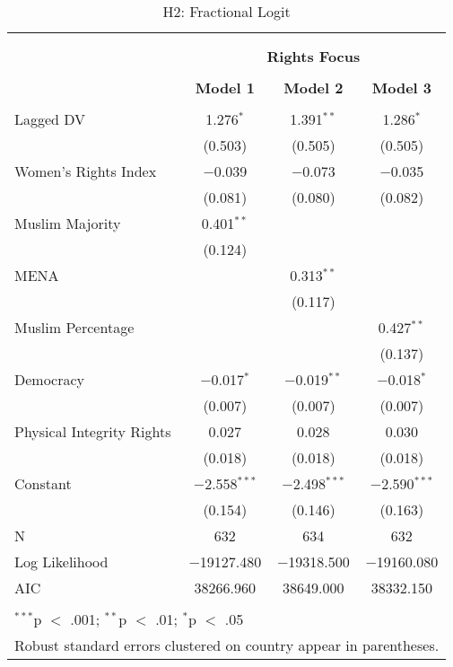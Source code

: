 
\begin{table}[!htbp] \centering 
  \caption{H2: Fractional Logit} 
  \label{} 
\begin{tabular}{@{\extracolsep{5pt}}lccc} 
\\[-1.8ex]\hline \\[-1.8ex] 
\\[-1.8ex] & \multicolumn{3}{c}{\textbf{Rights Focus}} \\ 
\\[-1.8ex] & \textbf{Model 1} & \textbf{Model 2} & \textbf{Model 3}\\ 
\hline \\[-1.8ex] 
 Lagged DV & 1.276$^{*}$ & 1.391$^{**}$ & 1.286$^{*}$ \\ 
  & (0.503) & (0.505) & (0.505) \\ 
  Women's Rights Index & $-$0.039 & $-$0.073 & $-$0.035 \\ 
  & (0.081) & (0.080) & (0.082) \\ 
  Muslim Majority & 0.401$^{**}$ &  &  \\ 
  & (0.124) &  &  \\ 
  MENA &  & 0.313$^{**}$ &  \\ 
  &  & (0.117) &  \\ 
  Muslim Percentage &  &  & 0.427$^{**}$ \\ 
  &  &  & (0.137) \\ 
  Democracy & $-$0.017$^{*}$ & $-$0.019$^{**}$ & $-$0.018$^{*}$ \\ 
  & (0.007) & (0.007) & (0.007) \\ 
  Physical Integrity Rights & 0.027 & 0.028 & 0.030 \\ 
  & (0.018) & (0.018) & (0.018) \\ 
  Constant & $-$2.558$^{***}$ & $-$2.498$^{***}$ & $-$2.590$^{***}$ \\ 
  & (0.154) & (0.146) & (0.163) \\ 
 N & 632 & 634 & 632 \\ 
Log Likelihood & $-$19127.480 & $-$19318.500 & $-$19160.080 \\ 
AIC & 38266.960 & 38649.000 & 38332.150 \\ 
\hline \\[-1.8ex] 
\multicolumn{4}{l}{$^{***}$p $<$ .001; $^{**}$p $<$ .01; $^{*}$p $<$ .05} \\ 
\multicolumn{4}{l}{Robust standard errors clustered on country appear in parentheses.} \\ 
\end{tabular} 
\end{table} 
